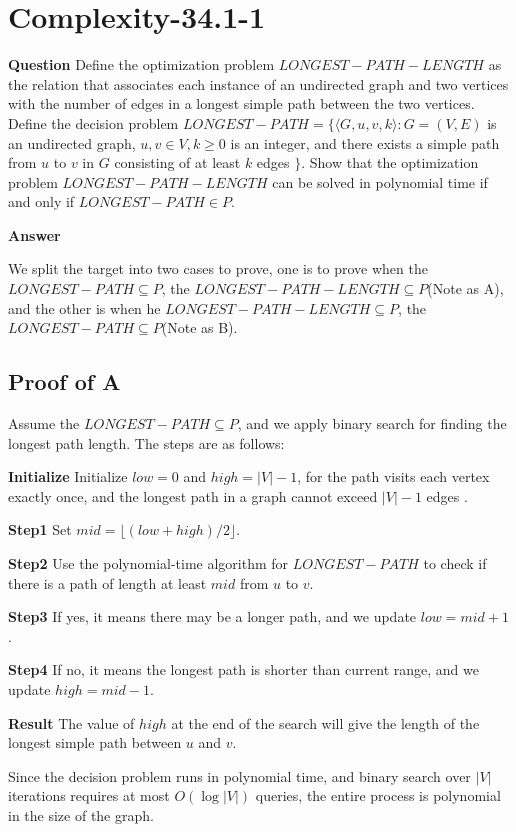 \documentclass[12pt]{article}
\begin{document}
\section{Complexity-34.1-1}
\textbf{Question}
Define the optimization problem $LONGEST-PATH-LENGTH$ as the relation that associates each instance of an undirected graph and two vertices with the number of edges in a longest simple path between the two vertices. Define the decision problem $LONGEST-PATH= \{\langle G, u, v, k\rangle: G = (V, E)$ is an undirected graph, $u, v \in V, k \ge 0$ is an integer, and there exists a simple path from $u$ to $v$ in $G$ consisting of at least $k$ edges $\}$. Show that the optimization problem $LONGEST-PATH-LENGTH$ can be solved in polynomial time if and only if $LONGEST-PATH \in P$.

\textbf{Answer}

We split the target into two cases to prove, one is to prove when the $LONGEST-PATH \subseteq P$, the $LONGEST-PATH-LENGTH \subseteq P$(Note as A), and the other is when he $LONGEST-PATH-LENGTH \subseteq P$, the $LONGEST-PATH \subseteq P$(Note as B).
 
\subsection{Proof of A}
Assume the $LONGEST-PATH \subseteq P$, and we apply binary search for finding the longest path length. The steps are as follows:

\textbf{Initialize} Initialize $low = 0$ and $high = |V| - 1$, for the path visits each vertex exactly once, and the longest path in a graph cannot exceed $|V| - 1$ edges . 

\textbf{Step1} Set $mid = \lfloor (low + high) / 2 \rfloor$.

\textbf{Step2} Use the polynomial-time algorithm for $LONGEST-PATH$ to check if there is a path of length at least $mid$ from $u$ to $v$.

\textbf{Step3} If yes, it means there may be a longer path, and we update $low = mid + 1$.

\textbf{Step4} If no, it means the longest path is shorter than current range, and we update $high = mid - 1$.

\textbf{Result} The value of $high$ at the end of the search will give the length of the longest simple path between $u$ and $v$.

Since the decision problem runs in polynomial time, and binary search over $|V|$ iterations requires at most $O(\log |V|)$ queries, the entire process is polynomial in the size of the graph.
\end{document}
